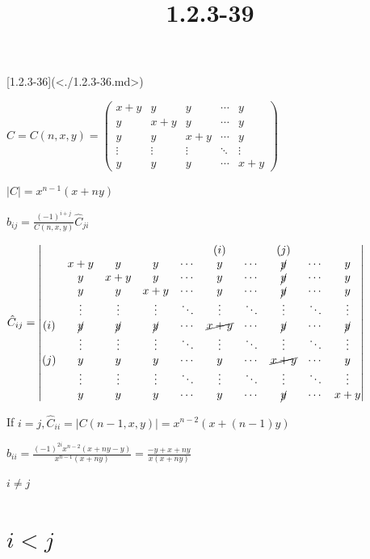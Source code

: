 \documentclass{article}
\title{1.2.3-39}
\begin{document}
\maketitle

[1.2.3-36](<./1.2.3-36.md>)

\( C = C(n,x,y) = \left(\begin{matrix}x + y & y & y & \cdots & y \\ y & x + y & y & \cdots & y \\ y & y & x + y & \cdots & y \\ \vdots & \vdots & \vdots & \ddots & \vdots \\ y & y & y & \cdots & x + y \end{matrix}\right) \)

\( |C| = x^{n-1}(x+ny) \)

\( b_{ij} = \frac{(-1)^{i+j}}{C(n,x,y)} \hat{C}_{ji} \)

\( \hat{C}_{ij} = \left|\begin{matrix} & & & & & (i) & & (j) \\ & x + y & y & y & \cdots & y & \cdots & \cancel{y} & \cdots & y \\ & y & x + y & y & \cdots & y & \cdots & \cancel{y} & \cdots & y \\ & y & y & x + y & \cdots & y & \cdots & \cancel{y} & \cdots & y \\ & \vdots & \vdots & \vdots & \ddots & \vdots & \ddots & \vdots & \ddots & \vdots \\ (i) & \cancel{y} & \cancel{y} & \cancel{y} & \cdots & \cancel{x+y} & \cdots & \cancel{y} & \cdots & \cancel{y}\\ & \vdots & \vdots & \vdots & \ddots & \vdots & \ddots & \vdots & \ddots & \vdots \\ (j) & y & y & y & \cdots & y & \cdots & \cancel{x+y} & \cdots & y \\ & \vdots & \vdots & \vdots & \ddots & \vdots & \ddots & \vdots & \ddots & \vdots \\ & y & y & y & \cdots & y & \cdots & \cancel{y} & \cdots & x + y \end{matrix}\right| \)

If \( i=j, \hat{C}_{ii} = |C(n-1,x,y)| = x^{n-2}(x+(n-1)y) \)

\( b_{ii} = \frac{(-1)^{2i}x^{n-2}(x+ny-y)}{x^{n-1}(x+ny)} = \frac{-y+x+ny}{x(x+ny)} \)

\( i \neq j \)

\section*{\( i < j \)}
\end{document}

